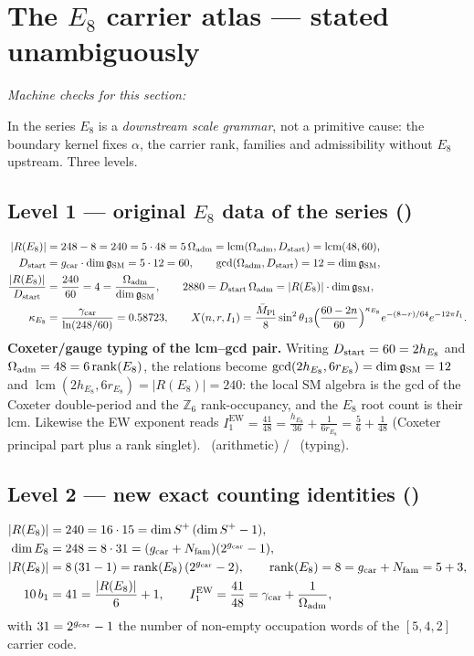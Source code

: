\section{The $E_8$ carrier atlas --- stated unambiguously}
\noindent\emph{Machine checks for this section:} 

\label{sec:e8}

In the series $E_8$ is a \emph{downstream scale grammar}, not a primitive cause: the boundary kernel
fixes $\alpha$, the carrier rank, families and admissibility without $E_8$ upstream. Three levels.

\subsection{Level 1 --- original $E_8$ data of the series (\mE)}
\begin{align}
  |R(E_8)| &= 248-8=240=5\cdot48=5\,\Omega_{\mathrm{adm}}=\operatorname{lcm}(\Omega_{\mathrm{adm}},D_{\mathrm{start}})=\operatorname{lcm}(48,60), \\
  D_{\mathrm{start}} &= g_{\mathrm{car}}\cdot\dim\mathfrak g_{\mathrm{SM}}=5\cdot12=60,\qquad \gcd(\Omega_{\mathrm{adm}},D_{\mathrm{start}})=12=\dim\mathfrak g_{\mathrm{SM}}, \\
  \frac{|R(E_8)|}{D_{\mathrm{start}}} &= \frac{240}{60}=4=\frac{\Omega_{\mathrm{adm}}}{\dim\mathfrak g_{\mathrm{SM}}},\qquad
  2880=D_{\mathrm{start}}\,\Omega_{\mathrm{adm}}=|R(E_8)|\cdot\dim\mathfrak g_{\mathrm{SM}}, \\
  \kappa_{E_8} &= \frac{\gamma_{\mathrm{car}}}{\ln(248/60)}=0.58723,\qquad
  X(n,r,I_1)=\frac{\bar M_{\mathrm{Pl}}}{8}\sin^2\theta_{13}\Bigl(\frac{60-2n}{60}\Bigr)^{\kappa_{E_8}}e^{-(8-r)/64}e^{-12\pi I_1}.
\end{align}
\textbf{Coxeter/gauge typing of the lcm--gcd pair.} Writing $D_{\mathrm{start}}=60=2h_{E_8}$ and
$\Omega_{\mathrm{adm}}=48=6\operatorname{rank}(E_8)$, the relations become
$\gcd(2h_{E_8},6r_{E_8})=\dim\mathfrak g_{\mathrm{SM}}=12$ and $\operatorname{lcm}(2h_{E_8},6r_{E_8})=|R(E_8)|=240$: the local
SM algebra is the gcd of the Coxeter double-period and the $\mathbb Z_6$ rank-occupancy, and the $E_8$
root count is their lcm. Likewise the EW exponent reads
$I_1^{\mathrm{EW}}=\tfrac{41}{48}=\tfrac{h_{E_8}}{36}+\tfrac{1}{6r_{E_8}}=\tfrac56+\tfrac{1}{48}$
(Coxeter principal part plus a rank singlet). \mE\ (arithmetic) / \mC\ (typing).

\subsection{Level 2 --- new exact counting identities (\mE)}
\begin{align}
  |R(E_8)| &= 240 = 16\cdot15=\dim S^+\,(\dim S^+-1), \\
  \dim E_8 &= 248 = 8\cdot31=(g_{\mathrm{car}}+N_{\mathrm{fam}})(2^{g_{\mathrm{car}}}-1), \\
  |R(E_8)| &= 8\,(31-1)=\operatorname{rank}(E_8)\,(2^{g_{\mathrm{car}}}-2),\qquad \operatorname{rank}(E_8)=8=g_{\mathrm{car}}+N_{\mathrm{fam}}=5+3, \\
  10\,b_1 &= 41 = \frac{|R(E_8)|}{6}+1,\qquad I_1^{\mathrm{EW}}=\frac{41}{48}=\gamma_{\mathrm{car}}+\frac{1}{\Omega_{\mathrm{adm}}},
\end{align}
with $31=2^{g_{\mathrm{car}}}-1$ the number of non-empty occupation words of the $[5,4,2]$ carrier code.

